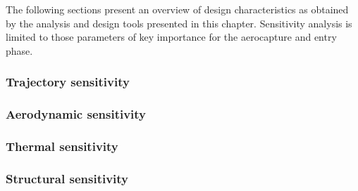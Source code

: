 The following sections present an overview of design characteristics as obtained by the analysis and design tools presented in this chapter. Sensitivity analysis is limited to those parameters of key importance for the aerocapture and entry phase.
\subsubsection{Trajectory sensitivity}\label{subsec:orbitsens}


\subsubsection{Aerodynamic sensitivity}\label{subsec:aerosens}


%

\subsubsection{Thermal sensitivity}\label{subsec:thermalsens}


\subsubsection{Structural sensitivity}\label{subsec:strucsens}






